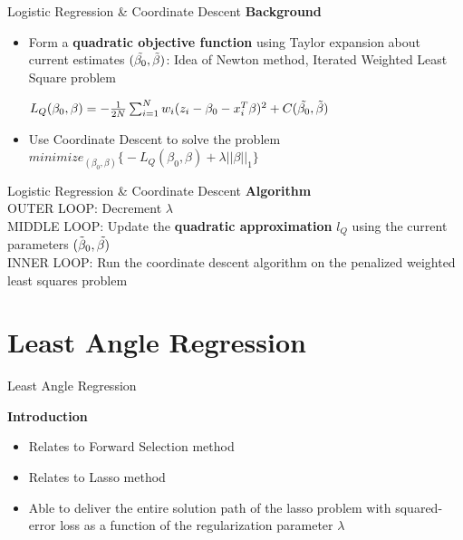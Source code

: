 \documentclass{beamer}
\begin{document}
\begin{frame}{Logistic Regression \& Coordinate Descent}
\textbf{Background}
\vspace*{3mm}
\begin{itemize}
    \item Form a \textbf{quadratic objective function} using Taylor expansion about current estimates \((\Tilde{\beta_0},\Tilde{\beta})\): Idea of Newton method, Iterated Weighted Least Square problem  
\vspace*{3mm}
    
\(L_Q(\beta_0,\beta)=-\frac{1}{2N}\sum_{i=1}^{N}w_i(z_i-\beta_0-x_i^T\beta)^2+C(\Tilde{\beta_0},\Tilde{\beta})\) 

\vspace*{3mm}

\item Use Coordinate Descent to solve the problem  \\ 
\vspace*{2mm}
\(minimize_{(\beta_0 , \beta)} \big\{ -L_Q (\beta_0,\beta)+\lambda \lvert \lvert \beta \lvert\lvert_{1} \big\} \)

\end{itemize}
\end{frame}

\begin{frame}{Logistic Regression \& Coordinate Descent}
\textbf{Algorithm}\\
\vspace*{3mm}
OUTER LOOP: Decrement $\lambda$ \\
\vspace*{3mm}
MIDDLE LOOP: Update the \textbf{quadratic approximation} $l_{Q}$ using the current parameters \(\Tilde{(\beta_0},\Tilde{\beta)}\)\\
\vspace*{3mm}
INNER LOOP: Run the coordinate descent algorithm on the penalized weighted least squares problem


\end{frame}
\section{Least Angle Regression}
\begin{frame}{Least Angle Regression}

\textbf{Introduction}
\vspace*{3mm}
\begin{itemize}
    \item Relates to Forward Selection method
    \vspace*{3mm}
    \item Relates to Lasso method 
     \vspace*{3mm}
    \item Able to deliver the entire solution path of the lasso problem with squared-error loss as a function of the regularization parameter $\lambda$
\end{itemize}
\end{frame}
\end{document}
